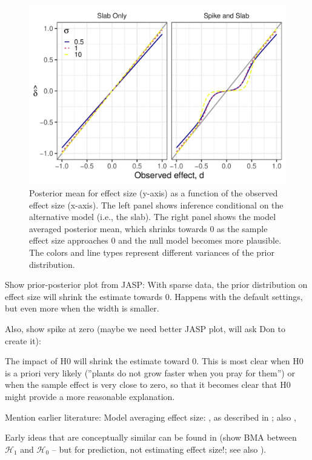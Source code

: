 \documentclass[a4paper]{article}
\begin{document}
\begin{figure}[!ht]
	\includegraphics[width=\textwidth]{posteriorMeanVsSampleDelta.pdf}
	\caption{Posterior mean for effect size (y-axis) as a function of the observed effect size (x-axis). The left panel shows inference conditional on the alternative model (i.e., the slab). The right panel shows the model averaged posterior mean, which shrinks towards 0 as the sample effect size approaches 0 and the null model becomes more plausible. The colors and line types represent different variances of the prior distribution.}
	\label{fig:posteriorMeanVsSampleDelta}
\end{figure}


Show prior-posterior plot from JASP:
With sparse data, the prior distribution on effect size will shrink the estimate towards 0. Happens with the default settings, but even more when the width is smaller.

Also, show spike at zero (maybe we need better JASP plot, will ask Don to create it):

The impact of H0 will shrink the estimate toward 0. This is most clear when H0 is a priori very likely (''plants do not grow faster when you pray for them'') or when the sample effect is very close to zero, so that it becomes clear that H0 might provide a more reasonable explanation.

Mention earlier literature:
Model averaging effect size:
\cite[pp. 640-641]{ZellnerVandaele1975}, as described in \cite[p. 600-601]{ZellnerSiow1980}; also \cite[p. 57]{Haldane1932}, \cite{IversonEtAl2010}

Early ideas that are conceptually similar can be found in \cite[p. 387]{WrinchJeffreys1921} (show BMA between $\mathcal{H}_1$ and $\mathcal{H}_0$ -- but for prediction, not estimating effect size!; see also \cite{Jevons18741913}).
\end{document}
